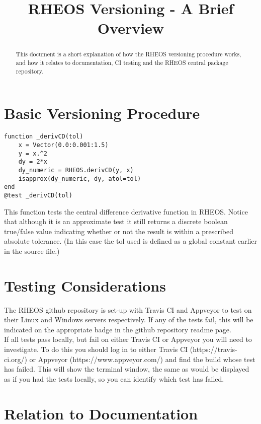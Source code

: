 \documentclass[]{article}
\title{RHEOS Versioning - A Brief Overview}
\author{}
\begin{document}
	
\date{}
\maketitle

\begin{abstract}
This document is a short explanation of how the RHEOS versioning procedure works, and how it relates to documentation, CI testing and the RHEOS central package repository.
\end{abstract}

\section{Basic Versioning Procedure}

\begin{verbatim}
function _derivCD(tol)
    x = Vector(0.0:0.001:1.5)
    y = x.^2
    dy = 2*x
    dy_numeric = RHEOS.derivCD(y, x)
    isapprox(dy_numeric, dy, atol=tol)
end
@test _derivCD(tol)
\end{verbatim}
This function tests the central difference derivative function in RHEOS. Notice that although it is an approximate test it still returns a discrete boolean true/false value indicating whether or not the result is within a prescribed absolute tolerance. (In this case the tol used is defined as a global constant earlier in the source file.)

\section{Testing Considerations}
The RHEOS github repository is set-up with Travis CI and Appveyor to test on their Linux and Windows servers respectively. If any of the tests fail, this will be indicated on the appropriate badge in the github repository readme page.\\

If all tests pass locally, but fail on either Travis CI or Appveyor you will need to investigate. To do this you should log in to either Travis CI (https://travis-ci.org/) or Appveyor (https://www.appveyor.com/) and find the build whose test has failed. This will show the terminal window, the same as would be displayed as if you had the tests locally, so you can identify which test has failed.

\section{Relation to Documentation}
\end{document}
